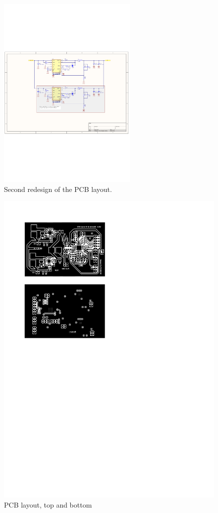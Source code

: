 \begin{figure}[H]
	\begin{centering}
		 \includegraphics[width=0.6\textwidth,page=3,angle=0]{images/SIG60_v0_4}
		\caption{Second redesign of the PCB layout.}
	\end{centering}
\end{figure}

\begin{figure}[H]
	\begin{centering}
		 \includegraphics[page=1,angle=90]{images/jens_print_4}
		\caption{PCB layout, top and bottom}
	\end{centering}
\end{figure}

